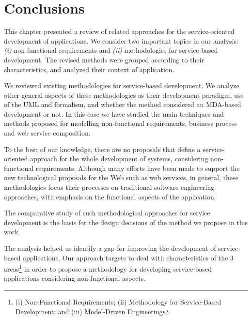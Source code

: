 \section{Conclusions}
\label{sec:stateofart_conclusion}


This chapter presented a review of related approaches for the
service-oriented development of applications. We consider two important
topics in our analysis: \textit{(i)} non-functional requirements and
\textit{(ii)} methodologies for service-based development. The revised methods
were grouped according to their characteristics, and analyzed their context
of application.
 

We reviewed existing methodologies for service-based development. We
analyze other general aspects of these methodologies as their
development paradigm, use of the UML and formalism, and whether the method
considered an MDA-based development or not. In this case we have studied the main techniques
and methods proposed for modelling non-functional requirements,
business process and web service composition.
% 

To the best of our knowledge, there are no proposals that define a
service-oriented approach for the whole development of systems, considering
non-functional requirements. Although many efforts have been made to support the new
technological proposals for the Web such as web services, in general, these
methodologies focus their processes on traditional software
engineering approaches, with emphasis on the functional aspects of the
application.

The comparative study of such methodological approaches for service development
is the basis for the design decisions of the method we propose in
this work.
 
  
 
The analysis helped us identify a gap for improving the development of service-based
applications. Our approach targets to deal with characteristics of the 3
areas\footnote{(i) Non-Functional Requirements; (ii) Methodology for Service-Based Development;
and (iii) Model-Driven Engineering} in order to propose a methodology for
developing service-based applications considering non-functional aspects.

